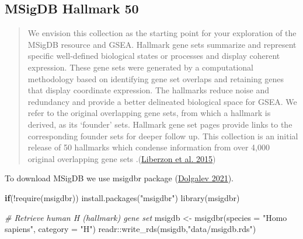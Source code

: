 \documentclass[
]{book}
\newenvironment{Shaded}{\begin{snugshade}}{\end{snugshade}}
\newcommand{\AttributeTok}[1]{\textcolor[rgb]{0.77,0.63,0.00}{#1}}
\newcommand{\CommentTok}[1]{\textcolor[rgb]{0.56,0.35,0.01}{\textit{#1}}}
\newcommand{\ControlFlowTok}[1]{\textcolor[rgb]{0.13,0.29,0.53}{\textbf{#1}}}
\newcommand{\FunctionTok}[1]{\textcolor[rgb]{0.00,0.00,0.00}{#1}}
\newcommand{\NormalTok}[1]{#1}
\newcommand{\OtherTok}[1]{\textcolor[rgb]{0.56,0.35,0.01}{#1}}
\newcommand{\SpecialCharTok}[1]{\textcolor[rgb]{0.00,0.00,0.00}{#1}}
\newcommand{\StringTok}[1]{\textcolor[rgb]{0.31,0.60,0.02}{#1}}
\begin{document}
\hypertarget{msigdb-hallmark-50}{%
\subsection{MSigDB Hallmark 50}\label{msigdb-hallmark-50}}

\begin{quote}
We envision this collection as the starting point for your exploration of the MSigDB resource and GSEA. Hallmark gene sets summarize and
represent specific well-defined biological states or processes and display coherent expression. These gene sets were generated by a computational methodology based on identifying gene set overlaps and retaining genes that display coordinate expression. The hallmarks reduce noise and redundancy and provide a better delineated biological space for GSEA. We refer to the original overlapping gene sets, from which a hallmark is derived, as its `founder' sets. Hallmark gene set pages provide links to the corresponding founder sets for deeper follow up.
This collection is an initial release of 50 hallmarks which condense information from over 4,000 original overlapping gene sets .(\protect\hyperlink{ref-liberzon2015molecular}{Liberzon et al. 2015})
\end{quote}

To download MSigDB we use msigdbr package (\protect\hyperlink{ref-msigdbr}{Dolgalev 2021}).

\begin{Shaded}
\begin{Highlighting}[]
\ControlFlowTok{if}\NormalTok{(}\SpecialCharTok{!}\FunctionTok{require}\NormalTok{(msigdbr)) }\FunctionTok{install.packages}\NormalTok{(}\StringTok{"msigdbr"}\NormalTok{)}
\FunctionTok{library}\NormalTok{(msigdbr)}

\CommentTok{\# Retrieve human H (hallmark) gene set}
\NormalTok{msigdb }\OtherTok{\textless{}{-}} \FunctionTok{msigdbr}\NormalTok{(}\AttributeTok{species =} \StringTok{"Homo sapiens"}\NormalTok{, }\AttributeTok{category =} \StringTok{"H"}\NormalTok{)}
\NormalTok{readr}\SpecialCharTok{::}\FunctionTok{write\_rds}\NormalTok{(msigdb,}\StringTok{"data/msigdb.rds"}\NormalTok{)}
\end{Highlighting}
\end{Shaded}
\end{document}
